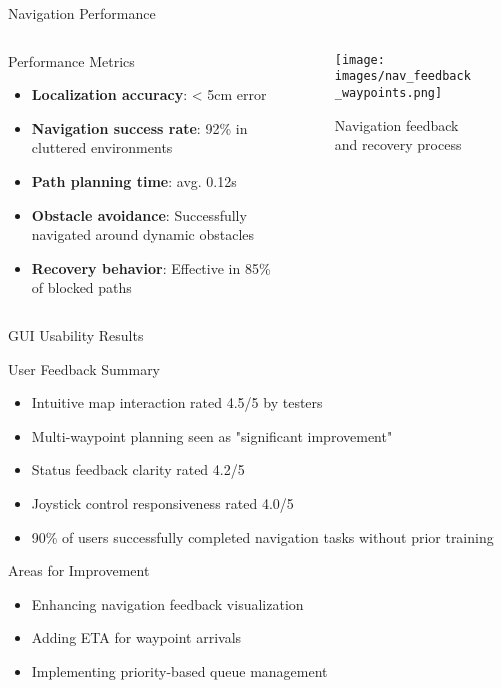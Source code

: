 \documentclass[aspectratio=169]{beamer}
\begin{document}
\begin{frame}{Navigation Performance}
  \begin{columns}
    \begin{column}{0.5\textwidth}
      \begin{block}{Performance Metrics}
        \begin{itemize}
        \item \textbf{Localization accuracy}: < 5cm error
        \item \textbf{Navigation success rate}: 92\% in cluttered environments
        \item \textbf{Path planning time}: avg. 0.12s
        \item \textbf{Obstacle avoidance}: Successfully navigated around dynamic obstacles
        \item \textbf{Recovery behavior}: Effective in 85\% of blocked paths
        \end{itemize}
      \end{block}
    \end{column}
    \begin{column}{0.2\textwidth}
      \begin{figure}
        \texttt{[image: images/nav\_feedback\_waypoints.png]}
        \caption{Navigation feedback and recovery process}
      \end{figure}
    \end{column}
  \end{columns}
\end{frame}

\begin{frame}{GUI Usability Results}
  \begin{exampleblock}{User Feedback Summary}
    \begin{itemize}
    \item Intuitive map interaction rated 4.5/5 by testers
    \item Multi-waypoint planning seen as "significant improvement"
    \item Status feedback clarity rated 4.2/5
    \item Joystick control responsiveness rated 4.0/5
    \item 90\% of users successfully completed navigation tasks without prior training
    \end{itemize}
  \end{exampleblock}
  
  \begin{alertblock}{Areas for Improvement}
    \begin{itemize}
    \item Enhancing navigation feedback visualization
    \item Adding ETA for waypoint arrivals
    \item Implementing priority-based queue management
    \end{itemize}
  \end{alertblock}
\end{frame}
\end{document}
